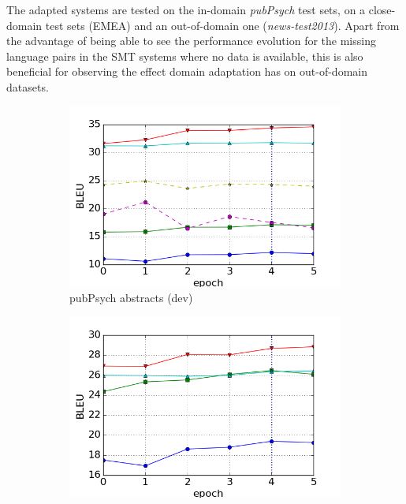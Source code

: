 \documentclass[a4paper,11pt]{article}
\begin{document}

The adapted systems are tested on the in-domain \textit{pubPsych} test sets, on a close-domain test sets (EMEA) and an out-of-domain one (\textit{news-test2013}). Apart from the advantage of being able to see the performance evolution for the missing language pairs in the SMT systems where no data is available, this is also beneficial for observing the effect domain adaptation has on out-of-domain datasets.

\begin{figure}
    \centering
    \begin{subfigure}[b]{0.45\textwidth}{
        \includegraphics[width=\textwidth]{./img/adam/pp_abs_dev}
        \caption{pubPsych abstracts (dev)}
        \label{fig:pp_abs_dev}}
    \end{subfigure}
    \begin{subfigure}[b]{0.45\textwidth}
        \includegraphics[width=\textwidth]{./img/adam/pp_abs_test}

\end{subfigure}
\end{figure}
\end{document}
